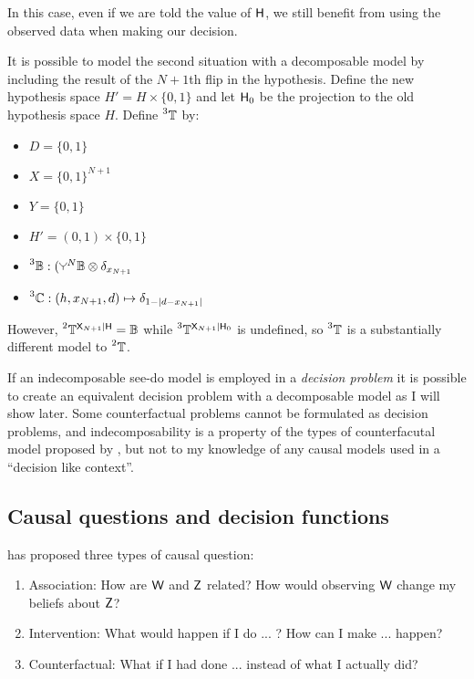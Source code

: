 In this case, even if we are told the value of $\mathsf{H}$, we still benefit from using the observed data when making our decision.

It is possible to model the second situation with a decomposable model by including the result of the $N+1$th flip in the hypothesis. Define the new hypothesis space $H'=H\times\{0,1\}$ and let $\mathsf{H}_0$ be the projection to the old hypothesis space $H$. Define $\prescript{3}{}{\ensuremath{\mathbb{T}}}$ by:

\begin{itemize}
    \item $D=\{0,1\}$
    \item $X=\{0,1\}^{N+1}$
    \item $Y=\{0,1\}$
    \item $H'=(0,1)\times\{0,1\}$
    \item $\prescript{3}{}{\kernel{B}}:(\splitter{0.1}^N\kernel{B}\otimes \delta_{x_{N+1}}$
    \item $\prescript{3}{}{\ensuremath{\mathbb{C}}}:(h,x_{N+1},d)\mapsto \delta_{1-|d-x_{N+1}|}$
\end{itemize}

However, $\prescript{2}{}{\ensuremath{\mathbb{T}}}^{\mathsf{X}_{N+1}|\mathsf{H}} = \mathbb{B}$ while $\prescript{3}{}{\ensuremath{\mathbb{T}}}^{\mathsf{X}_{N+1}|\mathsf{H}_0}$ is undefined, so $\prescript{3}{}{\ensuremath{\mathbb{T}}}$ is a substantially different model to $\prescript{2}{}{\ensuremath{\mathbb{T}}}$.

If an indecomposable see-do model is employed in a \emph{decision problem} it is possible to create an equivalent decision problem with a decomposable model as I will show later. Some counterfactual problems cannot be formulated as decision problems, and indecomposability is a property of the types of counterfacutal model proposed by \citet{pearl_causality:_2009}, but not to my knowledge of any causal models used in a ``decision like context''.

\subsection{Causal questions and decision functions}

\citet{pearl_book_2018} has proposed three types of causal question:
\begin{enumerate}
    \item Association: How are $\mathsf{W}$ and $\mathsf{Z}$ related? How would observing $\mathsf{W}$ change my beliefs about $\mathsf{Z}$?
    \item Intervention: What would happen if I do ... ? How can I make ... happen?
    \item Counterfactual: What if I had done ... instead of what I actually did?
\end{enumerate}

